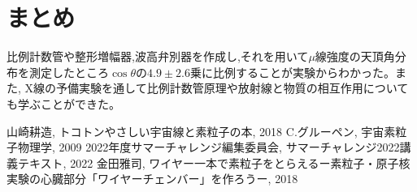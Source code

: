 \documentclass[a4j]{jsarticle}
\begin{document}
\section{まとめ}
比例計数管や整形増幅器,波高弁別器を作成し,それを用いて$\mu$線強度の天頂角分布を測定したところ$\cos\theta$の$4.9 \pm 2.6$乗に比例することが実験からわかった。また, X線の予備実験を通して比例計数管原理や放射線と物質の相互作用についても学ぶことができた。

\begin{thebibliography}{99}
 山崎耕造, トコトンやさしい宇宙線と素粒子の本, 2018
 C.グルーペン, 宇宙素粒子物理学, 2009
 2022年度サマーチャレンジ編集委員会, サマーチャレンジ2022講義テキスト, 2022
 金田雅司, ワイヤー一本で素粒子をとらえるー素粒子・原子核実験の心臓部分「ワイヤーチェンバー」を作ろうー, 2018
\end{thebibliography}
\end{document}
